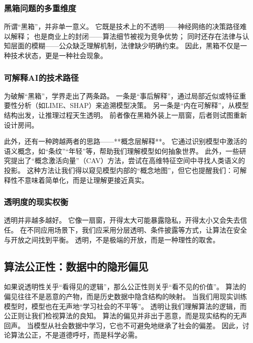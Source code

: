 \subsubsection{黑箱问题的多重维度}

所谓“黑箱”，并非单一意义。  
它既是技术上的不透明——神经网络的决策路径难以解释；  
也是商业上的封闭——算法细节被视为竞争优势；  
同时还存在法律与认知层面的模糊——公众缺乏理解机制，法律缺少明确约束。  
因此，黑箱不仅是一种技术状态，更是一种社会现象。

\subsubsection{可解释AI的技术路径}

为破解“黑箱”，学界走出了两条路。  
一条是“事后解释”，通过局部近似或特征重要性分析（如LIME、SHAP）来追溯模型决策。  
另一条是“内在可解释”，从模型结构出发，让推理过程天生透明。  
前者像在黑箱外装上一扇窗，后者则试图重新设计房间。

此外，还有一种跨越两者的思路——**概念层解释**。  
它通过识别模型中激活的语义概念，如“条纹”“年轻”等，帮助我们理解模型如何抽象世界。  
此外，一些研究提出了“概念激活向量”（CAV）方法，尝试在高维特征空间中寻找人类语义的投影。  
这种方法让我们得以窥见模型内部的“概念地图”，但它也提醒我们：可解释性不意味着简单化，而是让理解更接近真实。

\subsubsection{透明度的现实权衡}

透明并非越多越好。  
它像一扇窗，开得太大可能暴露隐私，开得太小又会失去信任。  
在不同应用场景下，我们应采用分层透明、条件披露等方式，让算法在安全与开放之间找到平衡。  
透明，不是极端的开放，而是一种理性的取舍。

\subsection{算法公正性：数据中的隐形偏见}

如果说透明性关乎“看得见的逻辑”，那么公正性则关乎“看不见的价值”。  
算法的偏见往往不是恶意的产物，而是历史数据中隐含结构的映射。  
当我们用现实训练模型时，模型也在无声地“学习社会的不平等”。  
透明让我们理解算法的逻辑，而公正则让我们检视算法的良知。  
算法的偏见并非出于恶意，而是现实结构的无声回声。  
当模型从社会数据中学习，它也不可避免地继承了社会的偏差。  
因此，讨论算法公正，不是道德呼吁，而是科学必需。

